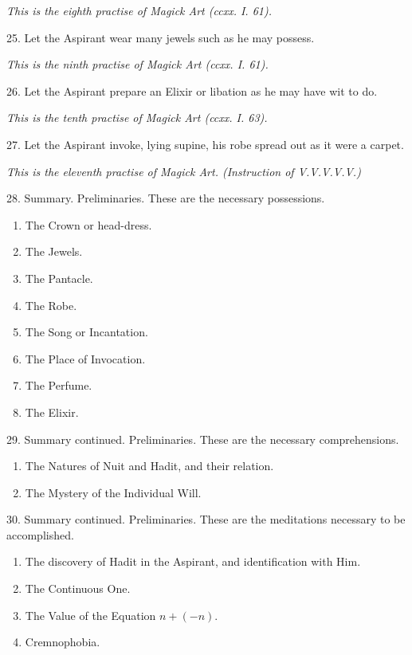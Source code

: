 \textit{This is the eighth practise of Magick Art (ccxx. I. 61).}

25. Let the Aspirant wear many jewels such as he may possess.

\textit{This is the ninth practise of Magick Art (ccxx. I. 61).}

26. Let the Aspirant prepare an Elixir or libation as he may have wit to do.

\textit{This is the tenth practise of Magick Art (ccxx. I. 63).}

27. Let the Aspirant invoke, lying supine, his robe spread out as it were a carpet.

\textit{This is the eleventh practise of Magick Art. (Instruction of V.V.V.V.V.)}

28. Summary. Preliminaries. These are the necessary possessions.
\begin{enumerate}[leftmargin=4\parindent]
\item The Crown or head-dress.
\item The Jewels.
\item The Pantacle.
\item The Robe.
\item The Song or Incantation.
\item The Place of Invocation.
\item The Perfume.
\item The Elixir.
\end{enumerate}

29. Summary continued. Preliminaries. These are the necessary comprehensions.

\begin{enumerate}[leftmargin=4\parindent]
\item The Natures of Nuit and Hadit, and their relation.
\item The Mystery of the Individual Will.
\end{enumerate}

30. Summary continued. Preliminaries. These are the meditations necessary to be accomplished.
\begin{enumerate}[leftmargin=4\parindent]
\item The discovery of Hadit in the Aspirant, and identification with Him.
\item The Continuous One.
\item The Value of the Equation $n + (-n)$.
\item Cremnophobia.
\end{enumerate}


